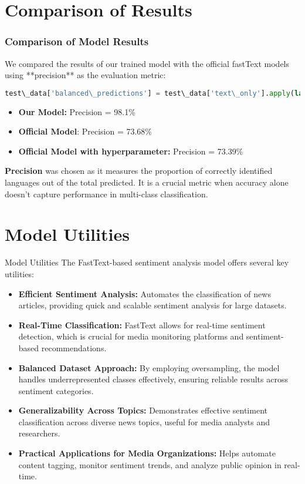 \documentclass{beamer}
\begin{document}
\section{Comparison of Results}
\begin{frame}[fragile]
    \frametitle{Comparison of Model Results}
    We compared the results of our trained model with the official fastText models using **precision** as the evaluation metric:

    \begin{lstlisting}[language=python]
    test\_data['balanced\_predictions'] = test\_data['text\_only'].apply(lambda x: balanced\_model.predict(x)[0][0])
    \end{lstlisting}

    \begin{itemize}
        \item \textbf{Our Model:} Precision = 98.1\%
        \item \textbf{Official Model}: Precision = 73.68\%
        \item \textbf{Official Model with hyperparameter:} Precision = 73.39\%
    \end{itemize}
    
    \textbf{Precision} was chosen as it measures the proportion of correctly identified languages out of the total predicted. It is a crucial metric when accuracy alone doesn't capture performance in multi-class classification.
\end{frame}

\section{Model Utilities}
\begin{frame}{Model Utilities}
    The FastText-based sentiment analysis model offers several key utilities:
    \begin{itemize}
        \item \textbf{Efficient Sentiment Analysis:} Automates the classification of news articles, providing quick and scalable sentiment analysis for large datasets.
        \item \textbf{Real-Time Classification:} FastText allows for real-time sentiment detection, which is crucial for media monitoring platforms and sentiment-based recommendations.
        \item \textbf{Balanced Dataset Approach:} By employing oversampling, the model handles underrepresented classes effectively, ensuring reliable results across sentiment categories.
        \item \textbf{Generalizability Across Topics:} Demonstrates effective sentiment classification across diverse news topics, useful for media analysts and researchers.
        \item \textbf{Practical Applications for Media Organizations:} Helps automate content tagging, monitor sentiment trends, and analyze public opinion in real-time.
    \end{itemize}
\end{frame}
\end{document}
